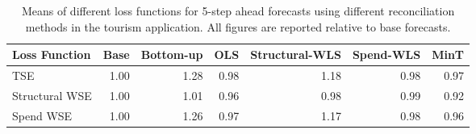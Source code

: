 \begin{table}[ht]
\centering
\begin{tabular}{lrrrrrr}
  \hline
Loss Function & Base & Bottom-up & OLS & Structural-WLS & Spend-WLS & MinT \\ 
  \hline
TSE & 1.00 & 1.28 & 0.98 & 1.18 & 0.98 & 0.97 \\ 
  Structural WSE & 1.00 & 1.01 & 0.96 & 0.98 & 0.99 & 0.92 \\ 
  Spend WSE & 1.00 & 1.26 & 0.97 & 1.17 & 0.98 & 0.96 \\ 
   \hline
\end{tabular}
\caption{Means of different loss functions for 5-step ahead forecasts using different reconciliation methods in the tourism application.  All figures are reported relative to base forecasts.} 
\end{table}

